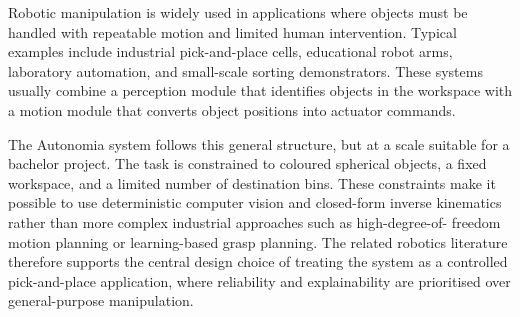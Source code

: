 \label{sec:robotics-applications}

Robotic manipulation is widely used in applications where objects must be
handled with repeatable motion and limited human intervention. Typical examples
include industrial pick-and-place cells, educational robot arms, laboratory
automation, and small-scale sorting demonstrators. These systems usually combine
a perception module that identifies objects in the workspace with a motion
module that converts object positions into actuator commands.

The Autonomia system follows this general structure, but at a scale suitable for
a bachelor project. The task is constrained to coloured spherical objects, a
fixed workspace, and a limited number of destination bins. These constraints make
it possible to use deterministic computer vision and closed-form inverse
kinematics rather than more complex industrial approaches such as high-degree-of-
freedom motion planning or learning-based grasp planning. The related robotics
literature therefore supports the central design choice of treating the system as
a controlled pick-and-place application, where reliability and explainability are
prioritised over general-purpose manipulation.
